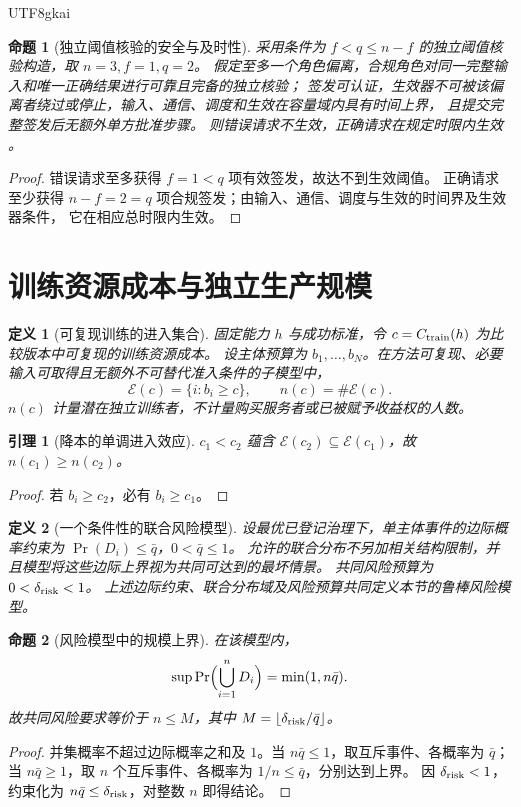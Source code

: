 \documentclass[12pt,a4paper,openany]{report}
\newtheorem{definition}{定义}[chapter]
\newtheorem{lemma}{引理}[chapter]
\newtheorem{proposition}{命题}[chapter]
\numberwithin{equation}{chapter}
\begin{document}
\begin{CJK*}{UTF8}{gkai}
\begin{proposition}[独立阈值核验的安全与及时性]
采用条件为 $f<q\le n-f$ 的独立阈值核验构造，取 $n=3,f=1,q=2$。
假定至多一个角色偏离，合规角色对同一完整输入和唯一正确结果进行可靠且完备的独立核验；
签发可认证，生效器不可被该偏离者绕过或停止，输入、通信、调度和生效在容量域内具有时间上界，
且提交完整签发后无额外单方批准步骤。
则错误请求不生效，正确请求在规定时限内生效
\cite[《偏好多样性、权利边界与可兑现分配》，“有限核验者模型：安全与及时性的不同门槛”节]{SourcePreference}。
\end{proposition}
\begin{proof}
错误请求至多获得 $f=1<q$ 项有效签发，故达不到生效阈值。
正确请求至少获得 $n-f=2=q$ 项合规签发；由输入、通信、调度与生效的时间界及生效器条件，
它在相应总时限内生效。
\end{proof}

\section{训练资源成本与独立生产规模}

\begin{definition}[可复现训练的进入集合]
固定能力 $h$ 与成功标准，令 $c=C_{\rm train}(h)$ 为比较版本中可复现的训练资源成本。
设主体预算为 $b_1,\ldots,b_N$。在方法可复现、必要输入可取得且无额外不可替代准入条件的子模型中，
\[
 \mathcal E(c)=\{i:b_i\ge c\},\qquad n(c)=\#\mathcal E(c).
\]
$n(c)$ 计量潜在独立训练者，不计量购买服务者或已被赋予收益权的人数。
\end{definition}

\begin{lemma}[降本的单调进入效应]
$c_1<c_2$ 蕴含 $\mathcal E(c_2)\subseteq\mathcal E(c_1)$，故 $n(c_1)\ge n(c_2)$。
\end{lemma}
\begin{proof}
若 $b_i\ge c_2$，必有 $b_i\ge c_1$。
\end{proof}

\begin{definition}[一个条件性的联合风险模型]
设最优已登记治理下，单主体事件的边际概率约束为
$\Pr(D_i)\le\bar q$，$0<\bar q\le1$。
允许的联合分布不另加相关结构限制，并且模型将这些边际上界视为共同可达到的最坏情景。
共同风险预算为 $0<\delta_{\rm risk}<1$。
上述边际约束、联合分布域及风险预算共同定义本节的鲁棒风险模型。
\end{definition}

\begin{proposition}[风险模型中的规模上界]
在该模型内，
\[
 \sup\Pr\Bigl(\bigcup_{i=1}^n D_i\Bigr)=\min(1,n\bar q).
\]
故共同风险要求等价于 $n\le M$，其中
$M=\lfloor\delta_{\rm risk}/\bar q\rfloor$。
\end{proposition}
\begin{proof}
并集概率不超过边际概率之和及 $1$。当 $n\bar q\le1$，取互斥事件、各概率为 $\bar q$；
当 $n\bar q\ge1$，取 $n$ 个互斥事件、各概率为 $1/n\le\bar q$，分别达到上界。
因 $\delta_{\rm risk}<1$，约束化为 $n\bar q\le\delta_{\rm risk}$，对整数 $n$ 即得结论。
\end{proof}


\end{CJK*}
\end{document}
